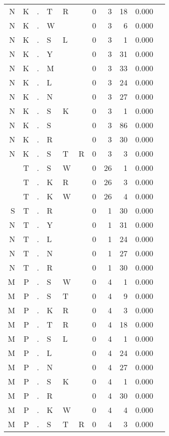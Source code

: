\begin{longtable}{r@{ } r@{ } c@{ } l@{ } l@{ } l@{ } r r r r l }
N & K & . & T & R &   & 0 & 3 & 18 & 0.000 &  \\
N & K & . & W &   &   & 0 & 3 & 6 & 0.000 &  \\
N & K & . & S & L &   & 0 & 3 & 1 & 0.000 &  \\
N & K & . & Y &   &   & 0 & 3 & 31 & 0.000 &  \\
N & K & . & M &   &   & 0 & 3 & 33 & 0.000 &  \\
N & K & . & L &   &   & 0 & 3 & 24 & 0.000 &  \\
N & K & . & N &   &   & 0 & 3 & 27 & 0.000 &  \\
N & K & . & S & K &   & 0 & 3 & 1 & 0.000 &  \\
N & K & . & S &   &   & 0 & 3 & 86 & 0.000 &  \\
N & K & . & R &   &   & 0 & 3 & 30 & 0.000 &  \\
N & K & . & S & T & R & 0 & 3 & 3 & 0.000 &  \\
  & T & . & S & W &   & 0 & 26 & 1 & 0.000 &  \\
  & T & . & K & R &   & 0 & 26 & 3 & 0.000 &  \\
  & T & . & K & W &   & 0 & 26 & 4 & 0.000 &  \\
S & T & . & R &   &   & 0 & 1 & 30 & 0.000 &  \\
N & T & . & Y &   &   & 0 & 1 & 31 & 0.000 &  \\
N & T & . & L &   &   & 0 & 1 & 24 & 0.000 &  \\
N & T & . & N &   &   & 0 & 1 & 27 & 0.000 &  \\
N & T & . & R &   &   & 0 & 1 & 30 & 0.000 &  \\
M & P & . & S & W &   & 0 & 4 & 1 & 0.000 &  \\
M & P & . & S & T &   & 0 & 4 & 9 & 0.000 &  \\
M & P & . & K & R &   & 0 & 4 & 3 & 0.000 &  \\
M & P & . & T & R &   & 0 & 4 & 18 & 0.000 &  \\
M & P & . & S & L &   & 0 & 4 & 1 & 0.000 &  \\
M & P & . & L &   &   & 0 & 4 & 24 & 0.000 &  \\
M & P & . & N &   &   & 0 & 4 & 27 & 0.000 &  \\
M & P & . & S & K &   & 0 & 4 & 1 & 0.000 &  \\
M & P & . & R &   &   & 0 & 4 & 30 & 0.000 &  \\
M & P & . & K & W &   & 0 & 4 & 4 & 0.000 &  \\
M & P & . & S & T & R & 0 & 4 & 3 & 0.000 &  \\

\end{longtable}
